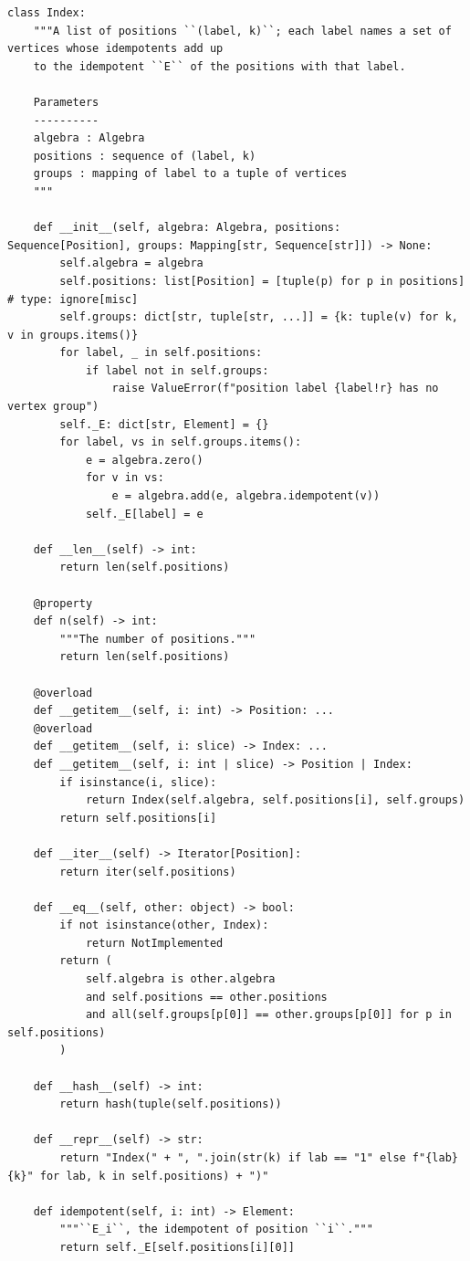 \documentclass[12pt, a4paper]{report}
\theoremstyle{plain}
\theoremstyle{definition}
\theoremstyle{remark}
\theoremstyle{plain}
\begin{document}
\begin{lstlisting}[style=dsqcode]
class Index:
    """A list of positions ``(label, k)``; each label names a set of vertices whose idempotents add up
    to the idempotent ``E`` of the positions with that label.

    Parameters
    ----------
    algebra : Algebra
    positions : sequence of (label, k)
    groups : mapping of label to a tuple of vertices
    """

    def __init__(self, algebra: Algebra, positions: Sequence[Position], groups: Mapping[str, Sequence[str]]) -> None:
        self.algebra = algebra
        self.positions: list[Position] = [tuple(p) for p in positions]  # type: ignore[misc]
        self.groups: dict[str, tuple[str, ...]] = {k: tuple(v) for k, v in groups.items()}
        for label, _ in self.positions:
            if label not in self.groups:
                raise ValueError(f"position label {label!r} has no vertex group")
        self._E: dict[str, Element] = {}
        for label, vs in self.groups.items():
            e = algebra.zero()
            for v in vs:
                e = algebra.add(e, algebra.idempotent(v))
            self._E[label] = e

    def __len__(self) -> int:
        return len(self.positions)

    @property
    def n(self) -> int:
        """The number of positions."""
        return len(self.positions)

    @overload
    def __getitem__(self, i: int) -> Position: ...
    @overload
    def __getitem__(self, i: slice) -> Index: ...
    def __getitem__(self, i: int | slice) -> Position | Index:
        if isinstance(i, slice):
            return Index(self.algebra, self.positions[i], self.groups)
        return self.positions[i]

    def __iter__(self) -> Iterator[Position]:
        return iter(self.positions)

    def __eq__(self, other: object) -> bool:
        if not isinstance(other, Index):
            return NotImplemented
        return (
            self.algebra is other.algebra
            and self.positions == other.positions
            and all(self.groups[p[0]] == other.groups[p[0]] for p in self.positions)
        )

    def __hash__(self) -> int:
        return hash(tuple(self.positions))

    def __repr__(self) -> str:
        return "Index(" + ", ".join(str(k) if lab == "1" else f"{lab}{k}" for lab, k in self.positions) + ")"

    def idempotent(self, i: int) -> Element:
        """``E_i``, the idempotent of position ``i``."""
        return self._E[self.positions[i][0]]


\end{lstlisting}
\end{document}
